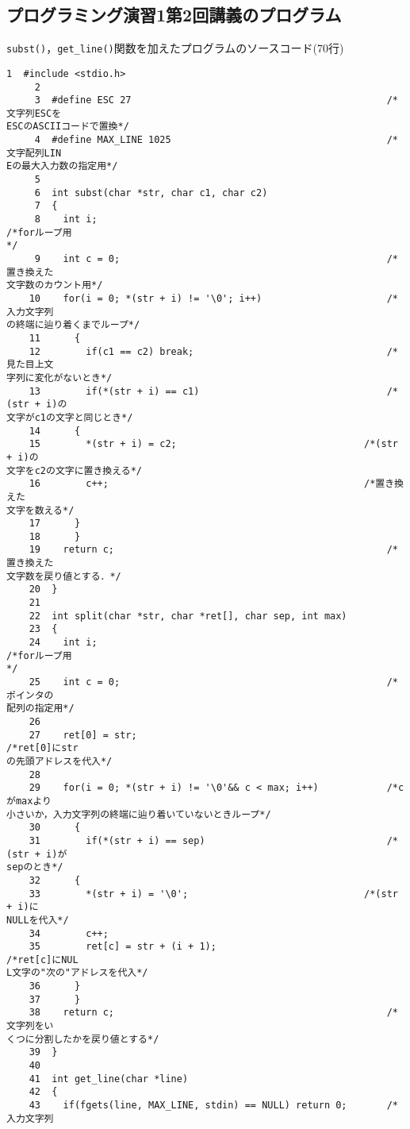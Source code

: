 \subsection{プログラミング演習1第2回講義のプログラム}\label{func2}
\verb|subst()|，\verb|get_line()|関数を加えたプログラムのソースコード(70行)
\begin{Verbatim}[fontsize=\small, baselinestretch=0.8]
     1	#include <stdio.h>
     2	
     3	#define ESC 27                                             /*文字列ESCを
ESCのASCIIコードで置換*/
     4	#define MAX_LINE 1025                                      /*文字配列LIN
Eの最大入力数の指定用*/
     5	
     6	int subst(char *str, char c1, char c2)
     7	{
     8	  int i;                                                   /*forループ用
*/
     9	  int c = 0;                                               /*置き換えた
文字数のカウント用*/
    10	  for(i = 0; *(str + i) != '\0'; i++)                      /*入力文字列
の終端に辿り着くまでループ*/
    11	    {
    12	      if(c1 == c2) break;                                  /*見た目上文
字列に変化がないとき*/
    13	      if(*(str + i) == c1)                                 /*(str + i)の
文字がc1の文字と同じとき*/
    14		{
    15		  *(str + i) = c2;                                 /*(str + i)の
文字をc2の文字に置き換える*/
    16		  c++;                                             /*置き換えた
文字を数える*/
    17		}
    18	    }
    19	  return c;                                                /*置き換えた
文字数を戻り値とする．*/
    20	}
    21	
    22	int split(char *str, char *ret[], char sep, int max)
    23	{
    24	  int i;                                                   /*forループ用
*/
    25	  int c = 0;                                               /*ポインタの
配列の指定用*/
    26	
    27	  ret[0] = str;                                            /*ret[0]にstr
の先頭アドレスを代入*/
    28	
    29	  for(i = 0; *(str + i) != '\0'&& c < max; i++)            /*cがmaxより
小さいか，入力文字列の終端に辿り着いていないときループ*/
    30	    {
    31	      if(*(str + i) == sep)                                /*(str + i)が
sepのとき*/
    32		{
    33		  *(str + i) = '\0';                               /*(str + i)に
NULLを代入*/
    34		  c++;
    35		  ret[c] = str + (i + 1);                          /*ret[c]にNUL
L文字の"次の"アドレスを代入*/
    36		}
    37	    }
    38	  return c;                                                /*文字列をい
くつに分割したかを戻り値とする*/
    39	}
    40	
    41	int get_line(char *line)
    42	{
    43	  if(fgets(line, MAX_LINE, stdin) == NULL) return 0;       /*入力文字列

\end{Verbatim}
